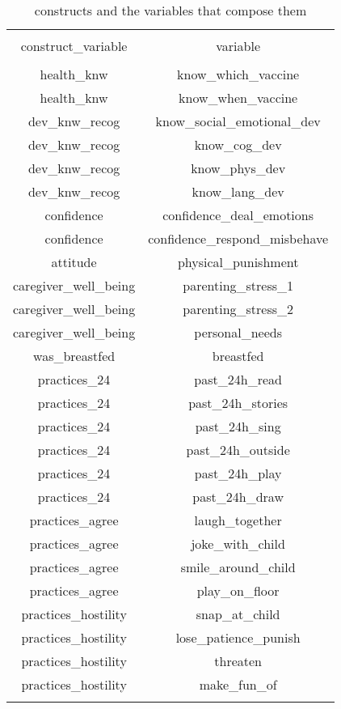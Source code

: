 
\begin{table}[!htbp] \centering 
  \caption{constructs and the variables that compose them} 
  \label{tbl:construct variable mapping} 
\begin{tabular}{@{\extracolsep{5pt}} cc} 
\\[-1.8ex]\hline 
\hline \\[-1.8ex] 
construct\_variable & variable \\ 
\hline \\[-1.8ex] 
health\_knw & know\_which\_vaccine \\ 
health\_knw & know\_when\_vaccine \\ 
dev\_knw\_recog & know\_social\_emotional\_dev \\ 
dev\_knw\_recog & know\_cog\_dev \\ 
dev\_knw\_recog & know\_phys\_dev \\ 
dev\_knw\_recog & know\_lang\_dev \\ 
confidence & confidence\_deal\_emotions \\ 
confidence & confidence\_respond\_misbehave \\ 
attitude & physical\_punishment \\ 
caregiver\_well\_being & parenting\_stress\_1 \\ 
caregiver\_well\_being & parenting\_stress\_2 \\ 
caregiver\_well\_being & personal\_needs \\ 
was\_breastfed & breastfed \\ 
practices\_24 & past\_24h\_read \\ 
practices\_24 & past\_24h\_stories \\ 
practices\_24 & past\_24h\_sing \\ 
practices\_24 & past\_24h\_outside \\ 
practices\_24 & past\_24h\_play \\ 
practices\_24 & past\_24h\_draw \\ 
practices\_agree & laugh\_together \\ 
practices\_agree & joke\_with\_child \\ 
practices\_agree & smile\_around\_child \\ 
practices\_agree & play\_on\_floor \\ 
practices\_hostility & snap\_at\_child \\ 
practices\_hostility & lose\_patience\_punish \\ 
practices\_hostility & threaten \\ 
practices\_hostility & make\_fun\_of \\ 
\hline \\[-1.8ex] 
\end{tabular} 
\end{table} 

